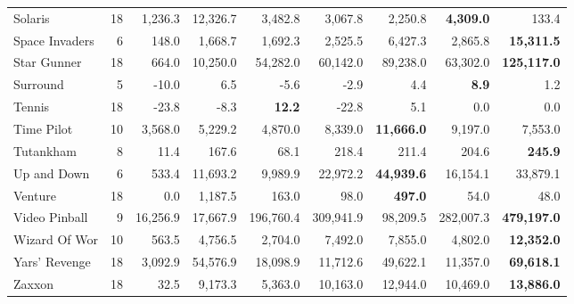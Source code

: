 \begin{table}[!b]
\begin{center}
\begin{tabular}{l|rrr|rrr|rr}
             Solaris &              18 &    1,236.3 &  12,326.7 &    3,482.8 &    3,067.8 &    2,250.8 &{\bf4,309.0}&        133.4 \\
      Space Invaders &               6 &      148.0 &   1,668.7 &    1,692.3 &    2,525.5 &    6,427.3 &    2,865.8 &{\bf15,311.5}\\
         Star Gunner &              18 &      664.0 &  10,250.0 &   54,282.0 &   60,142.0 &   89,238.0 &   63,302.0 &{\bf125,117.0}\\
           Surround  &               5 &      -10.0 &       6.5 &       -5.6 &       -2.9 &        4.4 &{\bf8.9}&          1.2 \\
              Tennis &              18 &      -23.8 &      -8.3 &{\bf12.2}&      -22.8 &        5.1 &        0.0 &          0.0 \\
          Time Pilot &              10 &    3,568.0 &   5,229.2 &    4,870.0 &    8,339.0 &{\bf11,666.0}&    9,197.0 &      7,553.0 \\
           Tutankham &               8 &       11.4 &     167.6 &       68.1 &      218.4 &      211.4 &      204.6 &{\bf245.9}\\
         Up and Down &               6 &      533.4 &  11,693.2 &    9,989.9 &   22,972.2 &{\bf44,939.6}&   16,154.1 &     33,879.1 \\
             Venture &              18 &        0.0 &   1,187.5 &      163.0 &       98.0 &{\bf497.0}&       54.0 &         48.0 \\
       Video Pinball &               9 &   16,256.9 &  17,667.9 &  196,760.4 &  309,941.9 &   98,209.5 &  282,007.3 &{\bf479,197.0}\\
       Wizard Of Wor &              10 &      563.5 &   4,756.5 &    2,704.0 &    7,492.0 &    7,855.0 &    4,802.0 &{\bf12,352.0}\\
       Yars' Revenge &              18 &    3,092.9 &  54,576.9 &   18,098.9 &   11,712.6 &   49,622.1 &   11,357.0 &{\bf69,618.1}\\
              Zaxxon &              18 &       32.5 &   9,173.3 &    5,363.0 &   10,163.0 &   12,944.0 &   10,469.0 &{\bf13,886.0}\\
\end{tabular}
\end{center}
\end{table}



